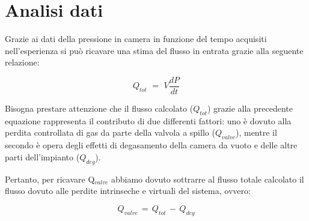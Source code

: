 \section{Analisi dati}

Grazie ai dati della pressione in camera in funzione del tempo acquisiti nell'esperienza si può ricavare una stima del flusso in entrata grazie alla seguente relazione:

\begin{equation}
	Q_{tot} \,\, = \,\, V \frac{dP}{dt}
\end{equation}

Bisogna prestare attenzione che il flusso calcolato ($Q_{tot}$) grazie alla precedente equazione rappresenta il contributo di due differenti fattori: uno è dovuto alla perdita controllata di gas da parte della valvola a spillo ($Q_{valve}$), mentre il secondo è opera degli effetti di degasamento della camera da vuoto e delle altre parti dell'impianto ($Q_{deg}$).

Pertanto, per ricavare Q$_{valve}$ abbiamo dovuto sottrarre al flusso totale calcolato il flusso  dovuto alle perdite intrinseche e virtuali del sistema, ovvero:

\begin{equation}
	Q_{valve} \, = \, Q_{tot} \, - \, Q_{deg}
\end{equation}
